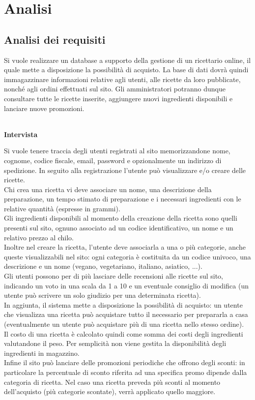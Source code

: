 \chapter{Analisi}

\section{Analisi dei requisiti}

Si vuole realizzare un database a supporto della gestione di un ricettario online, il quale mette a disposizione la possibilità di acquisto. 
La base di dati dovrà quindi immagazzinare informazioni relative agli utenti, alle ricette da loro pubblicate, nonché agli ordini effettuati 
sul sito. Gli amministratori potranno dunque consultare tutte le ricette inserite, aggiungere nuovi ingredienti disponibili e lanciare nuove 
promozioni.


\textbf{\\Intervista}


Si vuole tenere traccia degli utenti registrati al sito memorizzandone nome, cognome, codice fiscale, email, password e opzionalmente un indirizzo di spedizione.
In seguito alla registrazione l’utente può visualizzare e/o creare delle ricette.
\\Chi crea una ricetta vi deve associare un nome, una descrizione della preparazione, un tempo stimato di preparazione e i necessari ingredienti con le relative quantità (espresse in grammi).
\\Gli ingredienti disponibili al momento della creazione della ricetta sono quelli presenti sul sito, ognuno associato ad un codice identificativo, un nome e un relativo prezzo al chilo.
\\Inoltre nel creare la ricetta, l’utente deve associarla a una o più categorie, anche queste visualizzabili nel sito: ogni categoria è costituita da un codice univoco, una descrizione e un nome (vegano, vegetariano, italiano, asiatico, ...).
\\Gli utenti possono per di più lasciare delle recensioni alle ricette sul sito, indicando un voto in una scala da 1 a 10 e un eventuale consiglio di modifica (un utente può scrivere un solo giudizio per una determinata ricetta).
\\In aggiunta, il sistema mette a disposizione la possibilità di acquisto: un utente che visualizza una ricetta può acquistare tutto il necessario per prepararla a casa (eventualmente un utente può acquistare più di una ricetta nello stesso ordine).
\\Il costo di una ricetta è calcolato quindi come somma dei costi degli ingredienti valutandone il peso.
Per semplicità non viene gestita la disponibilità degli ingredienti in magazzino.
\\Infine il sito può lanciare delle promozioni periodiche che offrono degli sconti: in particolare la percentuale di sconto riferita ad una specifica promo dipende dalla categoria di ricetta.
Nel caso una ricetta preveda più sconti al momento dell’acquisto (più categorie scontate), verrà applicato quello maggiore.


